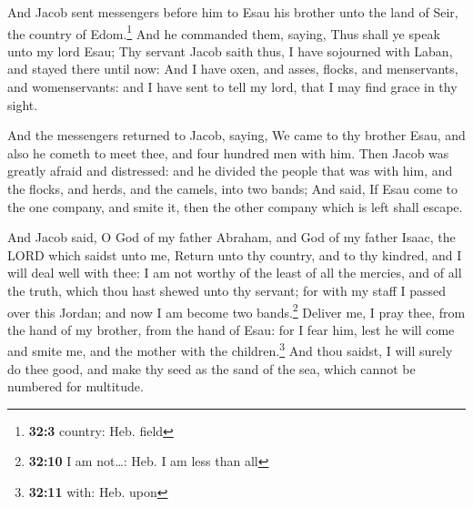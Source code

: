  And Jacob sent messengers before him to Esau his brother
unto the land of Seir, the country of Edom.\footnote{\textbf{32:3}
  country: Heb. field}  And he commanded them, saying,
Thus shall ye speak unto my lord Esau; Thy servant Jacob saith thus, I
have sojourned with Laban, and stayed there until now: 
And I have oxen, and asses, flocks, and menservants, and womenservants:
and I have sent to tell my lord, that I may find grace in thy sight.

 And the messengers returned to Jacob, saying, We came to
thy brother Esau, and also he cometh to meet thee, and four hundred men
with him.  Then Jacob was greatly afraid and distressed:
and he divided the people that was with him, and the flocks, and herds,
and the camels, into two bands;  And said, If Esau come to
the one company, and smite it, then the other company which is left
shall escape.

 And Jacob said, O God of my father Abraham, and God of my
father Isaac, the LORD which saidst unto me, Return unto thy country,
and to thy kindred, and I will deal well with thee:  I am
not worthy of the least of all the mercies, and of all the truth, which
thou hast shewed unto thy servant; for with my staff I passed over this
Jordan; and now I am become two bands.\footnote{\textbf{32:10} I am
  not\ldots: Heb. I am less than all}  Deliver me, I pray
thee, from the hand of my brother, from the hand of Esau: for I fear
him, lest he will come and smite me, and the mother with the
children.\footnote{\textbf{32:11} with: Heb. upon}  And
thou saidst, I will surely do thee good, and make thy seed as the sand
of the sea, which cannot be numbered for multitude.

